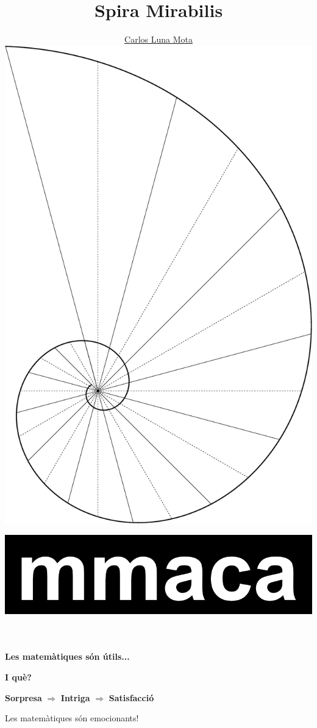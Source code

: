 \documentclass[14pt]{beamer}
\title{\Huge Spira Mirabilis\\[-1.2ex]}
\author{{\large \href{https://github.com/CarlosLunaMota}{Carlos Luna Mota}}\\[2ex]
        \includegraphics[width=22ex, angle=90]{pictures/Spiral_Phi_90.pdf}\\[-5ex]}
\date{\href{https://mmaca.cat/}{\includegraphics[scale=0.1]{pictures/MMACA.png}}}
\begin{document}

    \begin{frame}
      \titlepage
    \end{frame}


    \begin{frame}{}
        \begin{center}
            \bigskip
            
            \textbf{\Large Les matemàtiques són útils...}

            \bigskip \bigskip \bigskip \bigskip
            
            \textbf{\Huge I què?}
        \end{center}
    \end{frame}


    \begin{frame}{}
        \begin{center}
            {\Large \textbf{Sorpresa} $\Rightarrow$ \textbf{Intriga} $\Rightarrow$ \textbf{Satisfacció}}

            {\Large \bigskip \bigskip \bigskip \bigskip

            {Les matemàtiques són emocionants!}}
        \end{center}
    \end{frame}


    {
    \begin{frame}[plain]
    \end{frame}
    }
\end{document}
